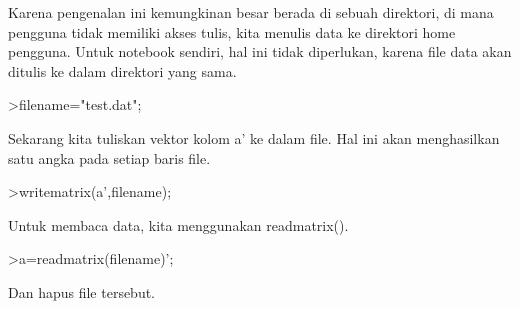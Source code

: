 \documentclass[a4paper,10pt]{article}
\begin{document}
\begin{eulernotebook}
\begin{eulercomment}
\begin{eulercomment}
\begin{eulercomment}
\begin{eulercomment}
\begin{eulercomment}
\begin{eulercomment}
\begin{eulercomment}
\begin{eulercomment}
\begin{eulercomment}
\begin{eulercomment}
\begin{eulercomment}
\begin{eulercomment}
\begin{eulercomment}
\begin{eulercomment}
\begin{eulercomment}
\begin{eulercomment}
\begin{eulercomment}
\begin{eulercomment}
\begin{eulercomment}
\begin{eulercomment}
\begin{eulercomment}
\begin{eulercomment}
\begin{eulercomment}
\begin{eulercomment}
\begin{eulercomment}
\begin{eulercomment}
\begin{eulercomment}
\begin{eulercomment}
\begin{eulercomment}
\begin{eulercomment}
\begin{eulercomment}
\begin{eulercomment}
\begin{eulercomment}
\begin{eulercomment}
\begin{eulercomment}
\begin{eulercomment}
\begin{eulercomment}
\begin{eulercomment}
\begin{eulercomment}
\begin{eulercomment}
\begin{eulercomment}
\begin{eulercomment}
\begin{eulercomment}
\begin{eulercomment}
\begin{eulercomment}
\begin{eulercomment}
\begin{eulercomment}
\begin{eulercomment}
\begin{eulercomment}
\begin{eulercomment}
\begin{eulercomment}
Karena pengenalan ini kemungkinan besar berada di sebuah direktori, di
mana pengguna tidak memiliki akses tulis, kita menulis data ke
direktori home pengguna. Untuk notebook sendiri, hal ini tidak
diperlukan, karena file data akan ditulis ke dalam direktori yang
sama.
\end{eulercomment}
\begin{eulerprompt}
>filename="test.dat";
\end{eulerprompt}
\begin{eulercomment}
Sekarang kita tuliskan vektor kolom a' ke dalam file. Hal ini akan
menghasilkan satu angka pada setiap baris file.
\end{eulercomment}
\begin{eulerprompt}
>writematrix(a',filename);
\end{eulerprompt}
\begin{eulercomment}
Untuk membaca data, kita menggunakan readmatrix().
\end{eulercomment}
\begin{eulerprompt}
>a=readmatrix(filename)';
\end{eulerprompt}
\begin{eulercomment}
Dan hapus file tersebut.
\end{eulercomment}

\end{eulercomment}
\end{eulercomment}
\end{eulercomment}
\end{eulercomment}
\end{eulercomment}
\end{eulercomment}
\end{eulercomment}
\end{eulercomment}
\end{eulercomment}
\end{eulercomment}
\end{eulercomment}
\end{eulercomment}
\end{eulercomment}
\end{eulercomment}
\end{eulercomment}
\end{eulercomment}
\end{eulercomment}
\end{eulercomment}
\end{eulercomment}
\end{eulercomment}
\end{eulercomment}
\end{eulercomment}
\end{eulercomment}
\end{eulercomment}
\end{eulercomment}
\end{eulercomment}
\end{eulercomment}
\end{eulercomment}
\end{eulercomment}
\end{eulercomment}
\end{eulercomment}
\end{eulercomment}
\end{eulercomment}
\end{eulercomment}
\end{eulercomment}
\end{eulercomment}
\end{eulercomment}
\end{eulercomment}
\end{eulercomment}
\end{eulercomment}
\end{eulercomment}
\end{eulercomment}
\end{eulercomment}
\end{eulercomment}
\end{eulercomment}
\end{eulercomment}
\end{eulercomment}
\end{eulercomment}
\end{eulercomment}
\end{eulercomment}
\end{eulernotebook}
\end{document}

